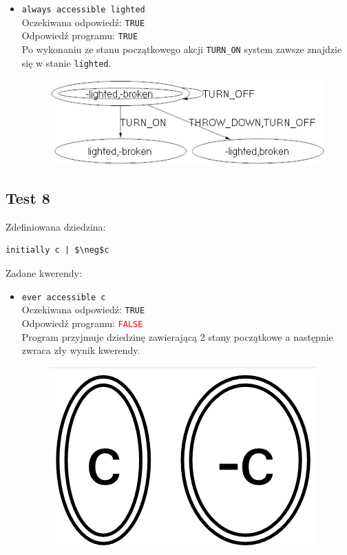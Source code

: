 \documentclass{article}
\begin{document}
\begin{itemize}
    \item {\large\texttt{always accessible lighted}}\\
	Oczekiwana odpowiedź: \texttt{TRUE}\\
    Odpowiedź programu: \texttt{TRUE}\\
    Po wykonaniu ze stanu początkowego akcji \texttt{TURN\_ON} system zawsze znajdzie się w stanie \texttt{lighted}.
    \begin{figure}[H]
    \centering
    \includegraphics[scale=0.5]{7_3}
    \end{figure}

\end{itemize}


\newpage
\subsection{Test 8}
Zdefiniowana dziedzina:
\bigskip
{}
\begin{lstlisting}[mathescape=true]
initially c | $\neg$c
\end{lstlisting}
\vspace{1cm}
Zadane kwerendy:
\begin{itemize}
	\item {\large\texttt{ever accessible c}}\\
	Oczekiwana odpowiedź: \texttt{TRUE}\\
	Odpowiedź programu: \textcolor{red}{\texttt{FALSE}}\\
	Program przyjmuje dziedzinę zawierającą 2 stany początkowe a następnie zwraca zły wynik kwerendy.
	\begin{figure}[H]
		\centering
		\includegraphics[scale=0.3]{c3}
	\end{figure}
\end{itemize}
\newpage
\end{document}
